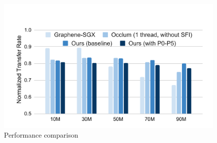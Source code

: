 \begin{figure}[htbp]
\centerline{\includegraphics[scale=0.42]{figures/fg-comparison.pdf}}
\vspace{-2pt}
\caption{Performance comparison}\label{fg-comparison}
\vspace{-15pt}
\end{figure}

